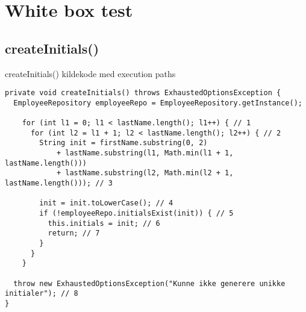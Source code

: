 \section{White box test\label{chap:white_box}}
\subsection{createInitials()}\label{sec:white_box_create_initials}

\begin{listing}[H]
    \centering
    \caption{createInitials() kildekode med execution paths}\label{lst:create_initials_source}
    \begin{verbatim}
private void createInitials() throws ExhaustedOptionsException {
  EmployeeRepository employeeRepo = EmployeeRepository.getInstance();

    for (int l1 = 0; l1 < lastName.length(); l1++) { // 1
      for (int l2 = l1 + 1; l2 < lastName.length(); l2++) { // 2
        String init = firstName.substring(0, 2)
            + lastName.substring(l1, Math.min(l1 + 1, lastName.length()))
            + lastName.substring(l2, Math.min(l2 + 1, lastName.length())); // 3

        init = init.toLowerCase(); // 4
        if (!employeeRepo.initialsExist(init)) { // 5
          this.initials = init; // 6
          return; // 7
        }
      }
    }

  throw new ExhaustedOptionsException("Kunne ikke generere unikke initialer"); // 8
}
    \end{verbatim}
\end{listing}

